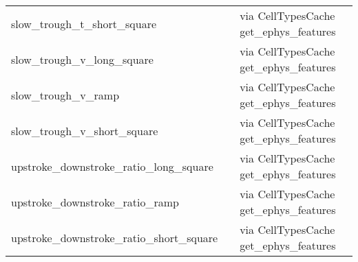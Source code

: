\documentclass[landscape]{article}
\begin{document}
\begin{longtabu} {X[3,r,p]|X[4,l,p]|X[5,l,p]}
slow\_trough\_t\_short\_square 		&  & via CellTypesCache \textrightarrow get\_ephys\_features \\
slow\_trough\_v\_long\_square 		&  & via CellTypesCache \textrightarrow get\_ephys\_features \\	
slow\_trough\_v\_ramp 				&  & via CellTypesCache \textrightarrow get\_ephys\_features \\
slow\_trough\_v\_short\_square 		&  & via CellTypesCache \textrightarrow get\_ephys\_features \\
\hline
upstroke\_downstroke\_ratio\_long\_square 
									&  & via CellTypesCache \textrightarrow get\_ephys\_features \\
upstroke\_downstroke\_ratio\_ramp 	&  & via CellTypesCache \textrightarrow get\_ephys\_features \\
upstroke\_downstroke\_ratio\_short\_square 
									&  & via CellTypesCache \textrightarrow get\_ephys\_features \\


\end{longtabu}
\end{document}
